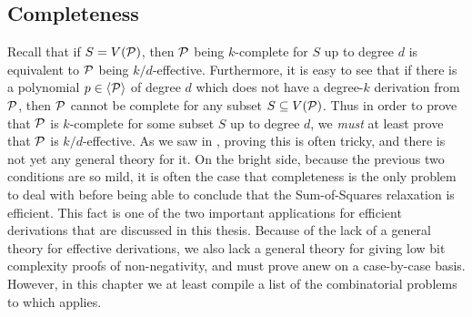 \subsection{Completeness}
Recall that if $S = V(\mathcal P)$, then $\mathcal P$ being $k$-complete for $S$ up to degree $d$ is equivalent to $\mathcal P$ being $k/d$-effective. Furthermore, it is easy to see that if there is a polynomial $p \in \langle \mathcal P \rangle$ of degree $d$ which does not have a degree-$k$ derivation from $\mathcal P$, then $\mathcal P$ cannot be complete for any subset $S \subseteq V(\mathcal P)$. Thus in order to prove that $\mathcal P$ is $k$-complete for some subset $S$ up to degree $d$, we \emph{must} at least prove that $\mathcal P$ is $k/d$-effective. As we saw in , proving this is often tricky, and there is not yet any general theory for it. On the bright side, because the previous two conditions are so mild, it is often the case that completeness is the only problem to deal with before being able to conclude that the Sum-of-Squares relaxation is efficient. This fact is one of the two important applications for efficient derivations that are discussed in this thesis. Because of the lack of a general theory for effective derivations, we also lack a general theory for giving low bit complexity proofs of non-negativity, and must prove anew on a case-by-case basis. However, in this chapter we at least compile a list of the combinatorial problems to which  applies.

